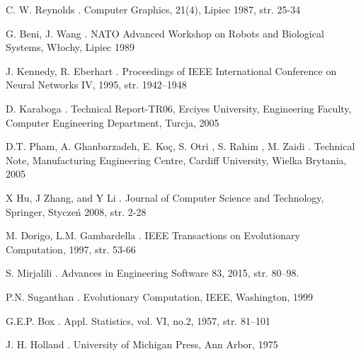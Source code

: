 

\begin{thebibliography}{1}

C. W. Reynolds
.
\newblock Computer Graphics, 21(4), Lipiec 1987, str. 25-34

G. Beni, J. Wang
.
\newblock NATO Advanced Workshop on Robots and Biological Systems, Włochy, Lipiec 1989

J. Kennedy, R. Eberhart
.
\newblock Proceedings of IEEE International Conference on Neural Networks IV, 1995, str. 1942–1948


D. Karaboga
.
\newblock  Technical Report-TR06, Erciyes University, Engineering Faculty, Computer Engineering Department, Turcja, 2005


D.T. Pham, A. Ghanbarzadeh, E. Koç, S. Otri , S. Rahim , M. Zaidi 
.
\newblock Technical Note, Manufacturing Engineering Centre, Cardiff University, Wielka Brytania, 2005


 X Hu, J Zhang, and Y Li
.
\newblock Journal of Computer Science and Technology, Springer, Styczeń 2008, str. 2-28


M. Dorigo, L.M. Gambardella
.
\newblock IEEE Transactions on Evolutionary Computation, 1997, str. 53-66


S. Mirjalili
.
\newblock Advances in Engineering Software 83, 2015, str. 80–98.


P.N. Suganthan
.
\newblock Evolutionary Computation, IEEE, Washington, 1999


G.E.P. Box 
.
\newblock Appl. Statistics, vol. VI, no.2, 1957, str. 81–101


J. H. Holland
.
\newblock  University of Michigan Press, Ann Arbor, 1975



\end{thebibliography}
